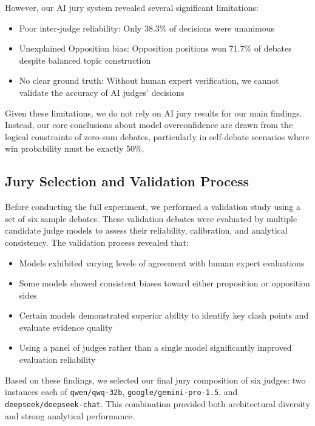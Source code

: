 \documentclass{article}
\begin{document}
However, our AI jury system revealed several significant limitations:
\begin{itemize}
    \item Poor inter-judge reliability: Only 38.3\% of decisions were unanimous
    \item Unexplained Opposition bias: Opposition positions won 71.7\% of debates despite balanced topic construction
    \item No clear ground truth: Without human expert verification, we cannot validate the accuracy of AI judges' decisions
\end{itemize}

Given these limitations, we do not rely on AI jury results for our main findings. Instead, our core conclusions about model overconfidence are drawn from the logical constraints of zero-sum debates, particularly in self-debate scenarios where win probability must be exactly 50\%.

\subsection{Jury Selection and Validation Process}

Before conducting the full experiment, we performed a validation study using a set of six sample debates. These validation debates were evaluated by multiple candidate judge models to assess their reliability, calibration, and analytical consistency. The validation process revealed that:

\begin{itemize}
    \item Models exhibited varying levels of agreement with human expert evaluations
    \item Some models showed consistent biases toward either proposition or opposition sides
    \item Certain models demonstrated superior ability to identify key clash points and evaluate evidence quality
    \item Using a panel of judges rather than a single model significantly improved evaluation reliability
\end{itemize}

Based on these findings, we selected our final jury composition of six judges: two instances each of \texttt{qwen/qwq-32b}, \texttt{google/gemini-pro-1.5}, and \texttt{deepseek/deepseek-chat}. This combination provided both architectural diversity and strong analytical performance.
\end{document}
